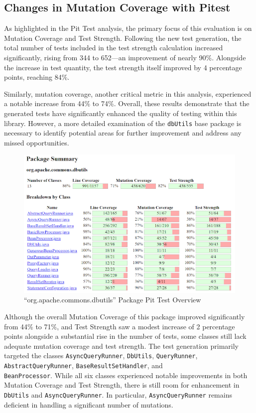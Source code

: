 \documentclass[sigconf]{acmart}
\begin{document}
\subsection*{Changes in Mutation Coverage with Pitest}

As highlighted in the Pit Test analysis, the primary focus of this evaluation is on Mutation Coverage and Test Strength. Following the new test generation, the total number of tests included in the test strength calculation increased significantly, rising from 344 to 652—an improvement of nearly 90\%. Alongside the increase in test quantity, the test strength itself improved by 4 percentage points, reaching 84\%.

Similarly, mutation coverage, another critical metric in this analysis, experienced a notable increase from 44\% to 74\%. Overall, these results demonstrate that the generated tests have significantly enhanced the quality of testing within this library. However, a more detailed examination of the \texttt{dbUtils} base package is necessary to identify potential areas for further improvement and address any missed opportunities.

\begin{figure}[H]
    \centering
    \includegraphics[width=1\linewidth]{images/pitest4.png}
    \caption{“org.apache.commons.dbutils” Package Pit Test Overview}
\end{figure}


Although the overall Mutation Coverage of this package improved significantly from 44\% to 71\%, and Test Strength saw a modest increase of 2 percentage points alongside a substantial rise in the number of tests, some classes still lack adequate mutation coverage and test strength. The test generation primarily targeted the classes \texttt{AsyncQueryRunner}, \texttt{DbUtils}, \texttt{QueryRunner}, \texttt{AbstractQueryRunner}, \texttt{BaseResultSetHandler}, and \\
\texttt{BeanProcessor}. While all six classes experienced notable improvements in both Mutation Coverage and Test Strength, there is still room for enhancement in \texttt{DbUtils} and \texttt{AsyncQueryRunner}. In particular, \texttt{AsyncQueryRunner} remains deficient in handling a significant number of mutations.
\end{document}
